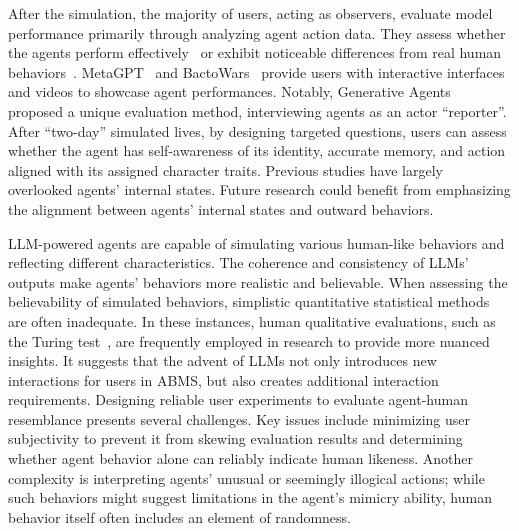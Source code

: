 After the simulation, the majority of users, acting as observers, evaluate model performance primarily through analyzing agent action data.
They assess whether the agents perform effectively~\cite{hua2024warpeacewaragentlarge,park2023choicematessupportingunfamiliaronline} or exhibit noticeable differences from real human behaviors~\cite{10.1145/3544548.3580688,10.1145/3526113.3545616,https://doi.org/10.1111/mila.12466}.
MetaGPT~\cite{hong2024metagptmetaprogrammingmultiagent} and BactoWars~\cite{berryman2008review} provide users with interactive interfaces and videos to showcase agent performances.
Notably, Generative Agents~\cite{10.1145/3586183.3606763} proposed a unique evaluation method, interviewing agents as an actor ``reporter''.
After ``two-day'' simulated lives, by designing targeted questions, users can assess whether the agent has self-awareness of its identity, accurate memory, and action aligned with its assigned character traits.
Previous studies have largely overlooked agents' internal states. 
Future research could benefit from emphasizing the alignment between agents' internal states and outward behaviors.

LLM-powered agents are capable of simulating various human-like behaviors and reflecting different characteristics.
The coherence and consistency of LLMs' outputs make agents' behaviors more realistic and believable.
When assessing the believability of simulated behaviors, simplistic quantitative statistical methods are often inadequate. 
In these instances, human qualitative evaluations, such as the Turing test~\cite{Turing2009}, are frequently employed in research to provide more nuanced insights.
It suggests that the advent of LLMs not only introduces new interactions for users in ABMS, but also creates additional interaction requirements.
Designing reliable user experiments to evaluate agent-human resemblance presents several challenges.
Key issues include minimizing user subjectivity to prevent it from skewing evaluation results and determining whether agent behavior alone can reliably indicate human likeness.
Another complexity is interpreting agents' unusual or seemingly illogical actions; while such behaviors might suggest limitations in the agent's mimicry ability, human behavior itself often includes an element of randomness.



